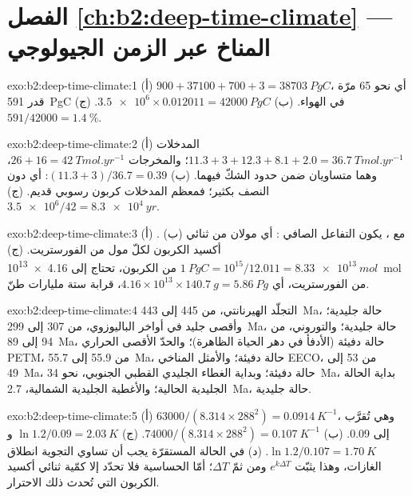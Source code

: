 \section*{الفصل \ref{ch:b2:deep-time-climate} --- المناخ عبر الزمن الجيولوجي}

\begin{solution}{exo:b2:deep-time-climate:1}
(أ) $900 + 37100 + 700 + 3 = \qty{38703}{PgC}$، أي نحو 65 مرّة قدر \qty{591}{PgC} في الهواء.
(ب) $\num{3.5e6}\times0.012011 = \qty{42000}{PgC}$. (ج) $591/42000 = \qty{1.4}{\percent}$.
\end{solution}

\begin{solution}{exo:b2:deep-time-climate:2}
(أ) المدخلات $11.3 + 3 + 12.3 + 8.1 + 2.0 = \qty{36.7}{Tmol.yr^{-1}}$؛ والمخرجات $26 + 16 =
\qty{42}{Tmol.yr^{-1}}$، وهما متساويان ضمن حدود الشكّ فيهما. (ب) $(11.3 + 3)/36.7 = 0.39$: أي دون
النصف بكثير؛ فمعظم المدخلات كربون رسوبي قديم. (ج) $\num{3.5e6}/42 = \qty{8.3e4}{yr}$.
\end{solution}

\begin{solution}{exo:b2:deep-time-climate:3}
(أ) . (ب) مع ، يكون التفاعل الصافي : أي مولان
من ثنائي أكسيد الكربون لكلّ مول من الفورستريت. (ج) $\qty{1}{PgC} = 10^{15}/12.011 =
\qty{8.33e13}{mol}$ من الكربون، تحتاج إلى \qty{4.16e13}{mol} من الفورستريت، أي $4.16\times10^{13}
\times\qty{140.7}{g} = \qty{5.86}{Pg}$، قرابة ستة مليارات طنّ.
\end{solution}

\begin{solution}{exo:b2:deep-time-climate:4}
التجلّد الهيرنانتي، من 445 إلى \qty{443}{Ma}، حالة جليدية؛ وأقصى جليد في أواخر الباليوزوي، من 307 إلى
\qty{299}{Ma}، حالة جليدية؛ والتوروني، من 94 إلى \qty{89}{Ma}، حالة دفيئة (الأدفأ في دهر الحياة الظاهرة)؛
والحدّ الأقصى الحراري PETM، من 55.9 إلى \qty{55.7}{Ma}، حالة دفيئة؛ والأمثل المناخي EECO، من 53 إلى \qty{49}{Ma}، حالة دفيئة؛ وبداية
الغطاء الجليدي القطبي الجنوبي، نحو \qty{34}{Ma}، بداية الحالة الجليدية الحالية؛ والأغطية الجليدية الشمالية،
\qty{2.7}{Ma}، حالة جليدية.
\end{solution}

\begin{solution}{exo:b2:deep-time-climate:5}
(أ) $63000/(8.314\times288^2) = \qty{0.0914}{K^{-1}}$، وهي تُقرَّب إلى 0.09. (ب) $74000/(8.314
\times288^2) = \qty{0.107}{K^{-1}}$. (ج) $\ln1.2/0.09 = \qty{2.03}{K}$ و$\ln 1.2/0.107 =
\qty{1.70}{K}$. (د) في الحالة المستقرّة يجب أن تساوي التجوية انطلاق الغازات، وهذا يثبّت $e^{k
\Delta T}$ ومن ثمّ $\Delta T$؛ أمّا الحساسية فلا تحدّد إلا كمّية ثنائي أكسيد الكربون التي تُحدث ذلك
الاحترار.
\end{solution}

